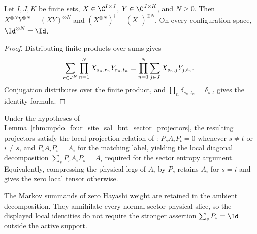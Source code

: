 \begin{lemma}
    \label{lem:mpdo_tensor_power_laws}
    \leanok
    Let $I,J,K$ be finite sets, $X\in\C^{I\times J}$,
    $Y\in\C^{J\times K}$, and $N\ge0$. Then
    $X^{\otimes N}Y^{\otimes N}=(XY)^{\otimes N}$ and
    $(X^{\otimes N})^\dagger=(X^\dagger)^{\otimes N}$.
    On every configuration space, $\Id^{\otimes N}=\Id$.
\end{lemma}
\begin{proof}\leanok
    Distributing finite products over sums gives
    \begin{align}
        \sum_{r\in J^N}\prod_{n=1}^{N}X_{s_n,r_n}Y_{r_n,t_n}
         & =\prod_{n=1}^{N}\sum_{j\in J}X_{s_n,j}Y_{j,t_n}.
        \notag
    \end{align}
    Conjugation distributes over the finite product, and
    $\prod_n\delta_{s_n,t_n}=\delta_{s,t}$ gives the identity formula.
\end{proof}

\begin{lemma}
    \label{thm:mpdo_bnt_projector_local_selection}
    \leanok
    Under the hypotheses of
    Lemma~\ref{thm:mpdo_four_site_sal_bnt_sector_projectors}, the resulting
    projectors satisfy the local projection relation of
    \cite[Appendix~C.2, lines~1680--1755]{Cirac2016MPDO_arXiv}:
    $P_sA_iP_t=0$ whenever $s\ne t$ or $i\ne s$, and $P_iA_iP_i=A_i$ for the
    matching label, yielding the local diagonal decomposition
    $\sum_sP_sA_iP_s=A_i$ required for the sector entropy argument.
    Equivalently, compressing the physical legs of $A_i$ by $P_s$ retains
    $A_i$ for $s=i$ and gives the zero local tensor otherwise.

    The Markov summands of zero Hayashi weight are retained in the ambient
    decomposition. They annihilate every normal-sector physical slice, so
    the displayed local identities do not require the stronger assertion
    $\sum_sP_s=\Id$ outside the active support.
\end{lemma}

